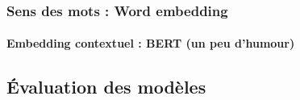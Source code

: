 \documentclass[xcolor=table]{beamer}
\begin{document}
%
%	
%
%	
%	

\begin{frame}
\frametitle{Sens des mots : Word embedding}
\framesubtitle{Embedding contextuel : BERT (un peu d'humour)}
	\vspace{-3pt}
	\begin{center}
	\end{center}
	
\end{frame}


\subsection{Évaluation des modèles}
\end{document}
